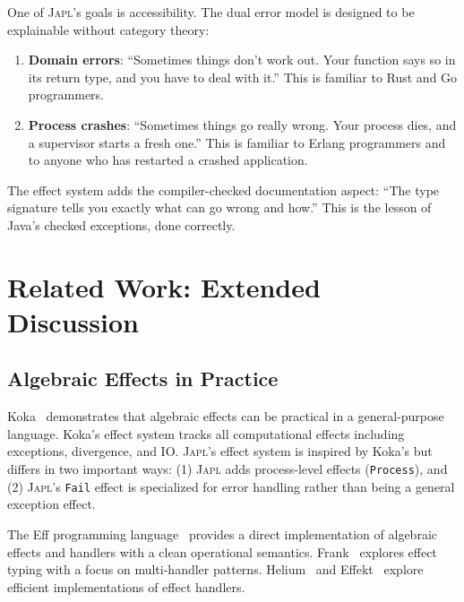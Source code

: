 \documentclass[11pt,twocolumn]{article}
\newcommand{\japl}{\textsc{Japl}}
\newcommand{\Fail}{\texttt{Fail}}
\begin{document}
One of \japl{}'s goals is accessibility. The dual error model is designed to be explainable without category theory:

\begin{enumerate}[leftmargin=*]
  \item \textbf{Domain errors}: ``Sometimes things don't work out. Your function says so in its return type, and you have to deal with it.'' This is familiar to Rust and Go programmers.
  \item \textbf{Process crashes}: ``Sometimes things go really wrong. Your process dies, and a supervisor starts a fresh one.'' This is familiar to Erlang programmers and to anyone who has restarted a crashed application.
\end{enumerate}

The effect system adds the compiler-checked documentation aspect: ``The type signature tells you exactly what can go wrong and how.'' This is the lesson of Java's checked exceptions, done correctly.

\section{Related Work: Extended Discussion}\label{sec:extended-related}

\subsection{Algebraic Effects in Practice}

Koka~\cite{leijen2017type} demonstrates that algebraic effects can be practical in a general-purpose language. Koka's effect system tracks all computational effects including exceptions, divergence, and IO. \japl{}'s effect system is inspired by Koka's but differs in two important ways: (1) \japl{} adds process-level effects (\texttt{Process}), and (2) \japl{}'s \Fail{} effect is specialized for error handling rather than being a general exception effect.

The Eff programming language~\cite{bauer2015programming} provides a direct implementation of algebraic effects and handlers with a clean operational semantics. Frank~\cite{lindley2017frank} explores effect typing with a focus on multi-handler patterns. Helium~\cite{biernacki2019abstracting} and Effekt~\cite{brachthaeuser2020effects} explore efficient implementations of effect handlers.
\end{document}
